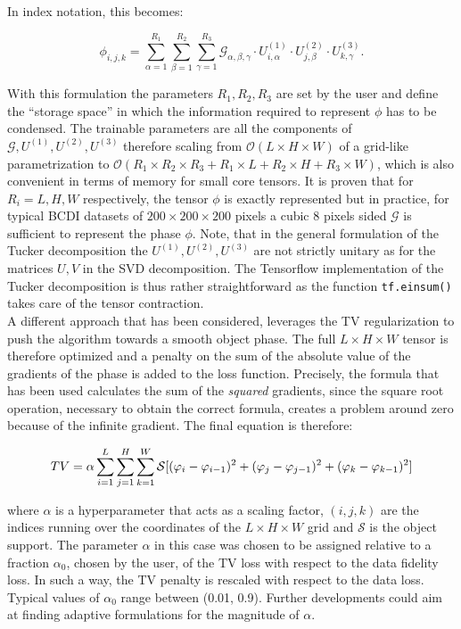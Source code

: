 In index notation, this becomes:

\[
\mathcal{\phi}_{i,j,k} = \sum_{\alpha=1}^{R_1} \sum_{\beta=1}^{R_2} \sum_{\gamma=1}^{R_3}
\mathcal{G}_{\alpha,\beta,\gamma} \cdot U^{(1)}_{i,\alpha} \cdot U^{(2)}_{j,\beta} \cdot U^{(3)}_{k,\gamma}.
\]

With this formulation the parameters $R_1, R_2, R_3$ are set by the user and define the ``storage space'' in which the 
information required to represent $\phi$ has to be condensed. The trainable parameters are all the components of 
$\mathcal{G}, U^{(1)}, U^{(2)},  U^{(3)}$ therefore scaling from $\mathcal{O}(L \times H \times W) $ of a grid-like 
parametrization to $\mathcal{O}(R_1 \times R_2 \times R_3 + R_1\times L + R_2\times H + R_3\times W)$, 
which is also convenient in terms of memory for small core tensors. It is proven that for $R_i = L,H,W$ respectively, the 
tensor $\phi$ is exactly represented but in practice, for typical BCDI datasets of $200 \times 200 \times 200$ pixels
a cubic 8 pixels sided $\mathcal{G}$ is sufficient to represent the phase $\phi$. Note, that in the general formulation of the Tucker 
decomposition the $ U^{(1)}, U^{(2)},  U^{(3)}$ are not strictly unitary as for the matrices $U, V$ in the SVD decomposition.  
The Tensorflow implementation of the Tucker decomposition is thus rather straightforward as the function 
\texttt{tf.einsum()} takes care of the tensor contraction.\\

A different approach that has been considered, leverages the TV regularization to push the algorithm towards a smooth object 
phase. The full $L\times H\times W$ tensor is therefore optimized and a penalty on the sum of the absolute value of the 
gradients of the phase is added to the loss function. Precisely, the formula that has been used calculates the sum of the 
\textit{squared} gradients, since the square root operation, necessary to obtain the correct formula, creates a 
problem around zero because of the infinite gradient. The final equation is therefore: 

\begin{equation}
\centering
   TV =  \alpha \sum_{i = 1}^{L}\sum_{j = 1}^{H}\sum_{k = 1}^{W} \mathcal S[(\varphi_{i} - \varphi_{i-1})^2 + (\varphi_{j} - \varphi_{j-1})^2 +  (\varphi_{k} - \varphi_{k-1})^2]
\end{equation}

where $\alpha $ is a hyperparameter that acts as a scaling factor, $(i,j,k)$ are the indices running over the coordinates of
the $L\times H\times W$ grid and $\mathcal S$ is the object support. The parameter $\alpha $ in this case was chosen 
to be assigned relative to a fraction $\alpha_0 $, chosen by the user, of the TV loss with respect to the data fidelity loss. 
In such a way, the TV penalty is rescaled with respect to the data loss. Typical values of $\alpha_0 $ range between (0.01, 0.9). 
Further developments could aim at finding adaptive formulations for the magnitude of $\alpha $. 

